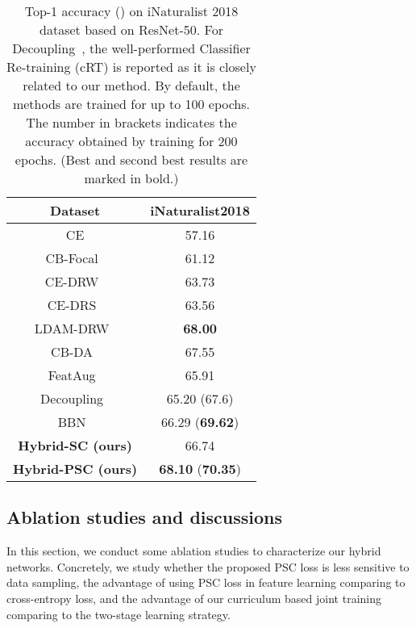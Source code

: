 \documentclass[final]{cvpr}
\begin{document}
\begin{table}[h]
\footnotesize
\center
\caption{Top-1 accuracy () on iNaturalist 2018 dataset based on ResNet-50. For Decoupling~\cite{Decoupling}, the well-performed Classifier Re-training (cRT) is reported as it is closely related to our method. By default, the methods are trained for up to 100 epochs. The number in brackets indicates the accuracy obtained by training for 200 epochs. (Best and second best results are marked in bold.)}
\vspace{0.5em}
\label{tab:inaturalist}
\begin{tabular}{|c||c|l|l|}
\hline
Dataset           & \multicolumn{3}{c|}{iNaturalist2018} \\ \hline \hline
CE                & \multicolumn{3}{c|}{57.16}           \\ \hline
CB-Focal~\cite{effnumber}          & \multicolumn{3}{c|}{61.12}           \\ \hline
CE-DRW~\cite{cao2019learning}            & \multicolumn{3}{c|}{63.73}           \\ \hline
CE-DRS~\cite{cao2019learning}            & \multicolumn{3}{c|}{63.56}           \\ \hline
LDAM-DRW~\cite{cao2019learning}          & \multicolumn{3}{c|}{\textbf{68.00}}            \\ \hline
CB-DA~\cite{CB-DA}             & \multicolumn{3}{c|}{67.55}           \\ \hline
FeatAug~\cite{feataug}           & \multicolumn{3}{c|}{65.91}           \\ \hline
Decoupling~\cite{Decoupling}        & \multicolumn{3}{c|}{65.20 (67.6)}            \\ \hline
BBN~\cite{BBN}               & \multicolumn{3}{c|}{66.29 (\textbf{69.62})}           \\ \hline \hline
\textbf{Hybrid-SC (ours)}  & \multicolumn{3}{c|}{66.74}           \\ \hline
\textbf{Hybrid-PSC (ours)} & \multicolumn{3}{c|}{\textbf{68.10} (\textbf{70.35})}            \\ \hline
\end{tabular}
\end{table}

\subsection{Ablation studies and discussions}
In this section, we conduct some ablation studies to characterize our hybrid networks. Concretely, we study whether the proposed PSC loss is less sensitive to data sampling, the advantage of using PSC loss in feature learning comparing to cross-entropy loss, and the advantage of our curriculum based joint training comparing to the two-stage learning strategy. 
\end{document}
